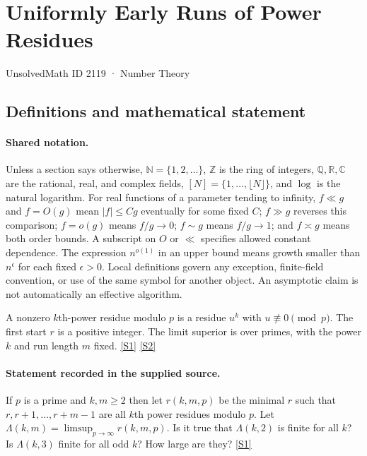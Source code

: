 \documentclass[11pt,a4paper]{article}
\newcommand{\N}{\mathbb{N}}
\newcommand{\Z}{\mathbb{Z}}
\newcommand{\Q}{\mathbb{Q}}
\newcommand{\R}{\mathbb{R}}
\newcommand{\C}{\mathbb{C}}
\newcommand{\sref}[2]{\hyperlink{source:#1:#2}{[S#2]}}
\begin{document}

\setcounter{section}{2118}

\section{Uniformly Early Runs of Power Residues}\label{2119}

{\small\sffamily UnsolvedMath ID 2119 · Number Theory}

\subsection{Definitions and mathematical statement}

\paragraph{Shared notation.}Unless a section says otherwise, $\N=\{1,2,\ldots\}$,
$\Z$ is the ring of integers, $\Q,\R,\C$ are the rational, real, and complex
fields, $[N]=\{1,\ldots,\lfloor N\rfloor\}$, and $\log$ is the natural
logarithm. For real functions of a parameter tending to infinity,
$f\ll g$ and $f=O(g)$ mean $|f|\leq Cg$ eventually for some fixed $C$;
$f\gg g$ reverses this comparison; $f=o(g)$ means $f/g\to0$;
$f\sim g$ means $f/g\to1$; and $f\asymp g$ means both order bounds.
A subscript on $O$ or $\ll$ specifies allowed constant dependence.
The expression $n^{o(1)}$ in an upper bound means growth smaller than
$n^\epsilon$ for each fixed $\epsilon>0$. Local definitions govern any
exception, finite-field convention, or use of the same symbol for another
object. An asymptotic claim is not automatically an effective algorithm.



A nonzero $k$th-power residue modulo $p$ is a residue $u^k$ with $u\not\equiv0\pmod p$. The first start $r$ is a positive integer. The limit superior is over primes, with the power $k$ and run length $m$ fixed. \sref{2119}{1} \sref{2119}{2}

\paragraph{Statement recorded in the supplied source.}
If $p$ is a prime and $k,m\geq 2$ then let $r(k,m,p)$ be the minimal $r$ such that $r,r+1,\ldots,r+m-1$ are all $k$th power residues modulo $p$. Let $ \Lambda(k,m)=\limsup_{p\to \infty} r(k,m,p). $ Is it true that $\Lambda(k,2)$ is finite for all $k$? Is $\Lambda(k,3)$ finite for all odd $k$? How large are they? \sref{2119}{1}
\end{document}
